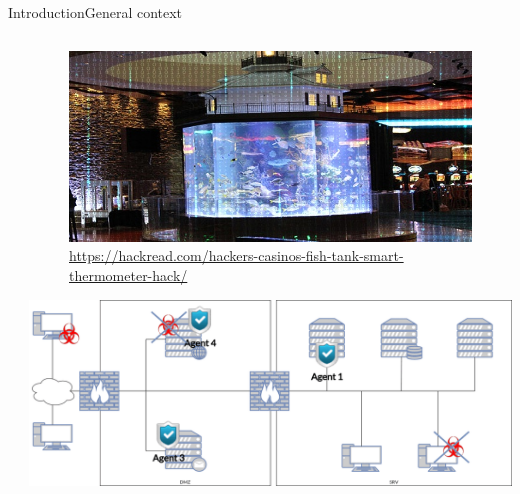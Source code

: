 \begin{frame}{Introduction}{General context}
\begin{columns}
\begin{column}{0.7\textwidth}
        \end{column}

        \begin{column}{0.4\textwidth}
            \begin{figure}
                \includegraphics[width=\linewidth]{figures/casino.jpg}
                \caption*{\tiny\url{https://hackread.com/hackers-casinos-fish-tank-smart-thermometer-hack/}}
            \end{figure}

            \vspace{0.cm}

            \includegraphics[width=\linewidth]{figures/company_network.png}
        \end{column}

    \end{columns}

\end{frame}

